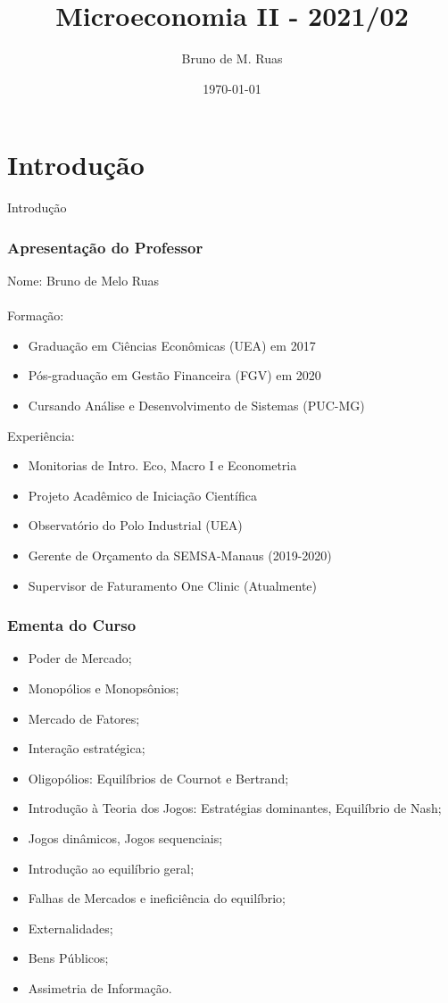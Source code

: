 \documentclass{beamer}[10]
\title[Micro II]{Microeconomia II - 2021/02}
\author{Bruno de M. Ruas}
\institute{Escola Superior de Ciências Sociais\\Universidade do Estado do Amazonas}
\date{\today}
\begin{document}
\frame{\titlepage \vspace{-0.5cm}} 


\section{Introdução}

\begin{frame}
	\Huge Introdução
\end{frame}

\begin{frame}
	\frametitle{Apresentação do Professor}
	Nome: Bruno de Melo Ruas
	\\~\\
	Formação:
	\begin{itemize}
		\item Graduação em Ciências Econômicas (UEA) em 2017
		\item Pós-graduação em Gestão Financeira (FGV) em 2020
		\item Cursando Análise e Desenvolvimento de Sistemas (PUC-MG)
	\end{itemize}

	Experiência:
	\begin{itemize}
		\item Monitorias de Intro. Eco, Macro I e Econometria
		\item Projeto Acadêmico de Iniciação Científica
		\item Observatório do Polo Industrial (UEA)
		\item Gerente de Orçamento da SEMSA-Manaus (2019-2020)
		\item Supervisor de Faturamento One Clinic (Atualmente)
	\end{itemize}
\end{frame}

\begin{frame}
	\frametitle{Ementa do Curso}
	\begin{itemize}
		\item Poder de Mercado;
		\item Monopólios e Monopsônios;
		\item Mercado de Fatores;
		\item Interação estratégica;
		\item Oligopólios: Equilíbrios de Cournot e Bertrand;
		\item Introdução à Teoria dos Jogos: Estratégias dominantes, Equilíbrio de Nash;
		\item Jogos dinâmicos, Jogos sequenciais;
		\item Introdução ao equilíbrio geral;
		\item Falhas de Mercados e ineficiência do equilíbrio;
		\item Externalidades;
		\item Bens Públicos;
		\item Assimetria de Informação.
	\end{itemize}
\end{frame}
\end{document}
